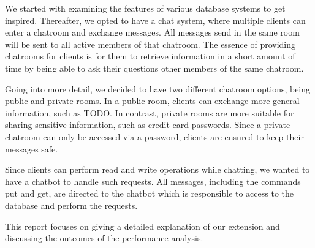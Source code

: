 We started with examining the features of various database systems to get inspired. Thereafter, we opted to have a chat system, where multiple clients can enter a chatroom and exchange messages. All messages send in the same room will be sent to all active members of that chatroom. The essence of providing chatrooms for clients is for them to retrieve information in a short amount of time by being able to ask their questions other members of the same chatroom. 

Going into more detail, we decided to have two different chatroom options, being public and private rooms. In a public room, clients can exchange more general information, such as TODO. In contrast, private rooms are more suitable for sharing sensitive information, such as credit card passwords. Since a private chatroom can only be accessed via a password, clients are ensured to keep their messages safe.

Since clients can perform read and write operations while chatting, we wanted to have a chatbot to handle such requests. All messages, including the commands put and get, are directed to the chatbot which is responsible to access to the database and perform the requests.
 
This report focuses on giving a detailed explanation of our extension and discussing the outcomes of the performance analysis.
